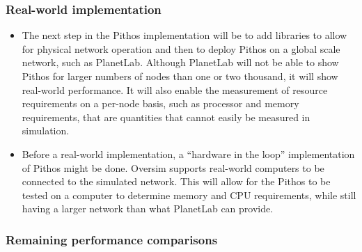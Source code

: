\subsubsection{Real-world implementation}
\begin{itemize}
\item The next step in the Pithos implementation will be to add libraries to allow for physical network operation and then to deploy Pithos on a global scale network, such as PlanetLab. Although PlanetLab will not be able to show Pithos for larger numbers of nodes than one or two thousand, it will show real-world performance. It will also enable the measurement of resource requirements on a per-node basis, such as processor and memory requirements, that are quantities that cannot easily be measured in simulation.

\item Before a real-world implementation, a ``hardware in the loop'' implementation of Pithos might be done. Oversim supports real-world computers to be connected to the simulated network. This will allow for the Pithos to be tested on a computer to determine memory and CPU requirements, while still having a larger network than what PlanetLab can provide.
\end{itemize}

\subsubsection{Remaining performance comparisons}


